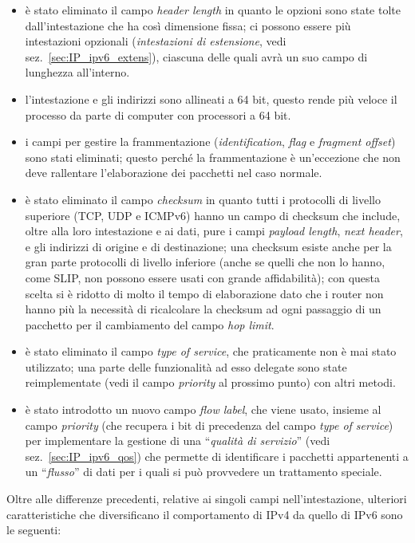\begin{itemize}
\item è stato eliminato il campo \textit{header length} in quanto le opzioni
  sono state tolte dall'intestazione che ha così dimensione fissa; ci possono
  essere più intestazioni opzionali (\textsl{intestazioni di estensione}, vedi
  sez.~\ref{sec:IP_ipv6_extens}), ciascuna delle quali avrà un suo campo di
  lunghezza all'interno.
\item l'intestazione e gli indirizzi sono allineati a 64 bit, questo rende più
  veloce il processo da parte di computer con processori a 64 bit.
\item i campi per gestire la frammentazione (\textit{identification},
  \textit{flag} e \textit{fragment offset}) sono stati eliminati; questo
  perché la frammentazione è un'eccezione che non deve rallentare
  l'elaborazione dei pacchetti nel caso normale.
\item è stato eliminato il campo \textit{checksum} in quanto tutti i
  protocolli di livello superiore (TCP, UDP e ICMPv6) hanno un campo di
  checksum che include, oltre alla loro intestazione e ai dati, pure i campi
  \textit{payload length}, \textit{next header}, e gli indirizzi di origine e
  di destinazione; una checksum esiste anche per la gran parte protocolli di
  livello inferiore (anche se quelli che non lo hanno, come SLIP, non possono
  essere usati con grande affidabilità); con questa scelta si è ridotto di
  molto il tempo di elaborazione dato che i router non hanno più la necessità
  di ricalcolare la checksum ad ogni passaggio di un pacchetto per il
  cambiamento del campo \textit{hop limit}.
\item è stato eliminato il campo \textit{type of service}, che praticamente
  non è mai stato utilizzato; una parte delle funzionalità ad esso delegate
  sono state reimplementate (vedi il campo \textit{priority} al prossimo
  punto) con altri metodi.
\item è stato introdotto un nuovo campo \textit{flow label}, che viene usato,
  insieme al campo \textit{priority} (che recupera i bit di precedenza del
  campo \textit{type of service}) per implementare la gestione di una
  ``\textsl{qualità di servizio}'' (vedi sez.~\ref{sec:IP_ipv6_qos}) che
  permette di identificare i pacchetti appartenenti a un ``\textsl{flusso}''
  di dati per i quali si può provvedere un trattamento speciale.
\end{itemize}

Oltre alle differenze precedenti, relative ai singoli campi nell'intestazione,
ulteriori caratteristiche che diversificano il comportamento di IPv4 da
quello di IPv6 sono le seguenti:

